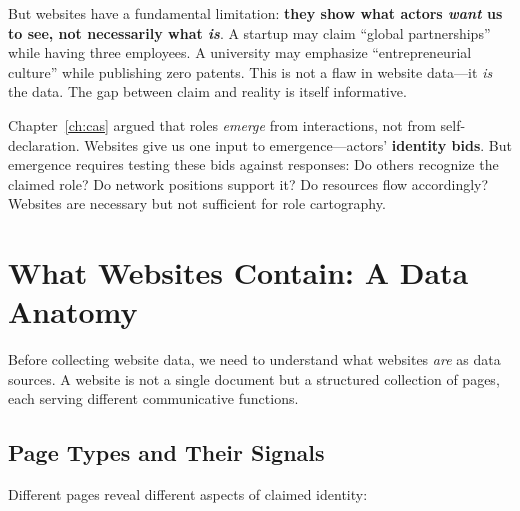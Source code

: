 But websites have a fundamental limitation: \textbf{they show what actors \emph{want} us to see, not necessarily what \emph{is}}. A startup may claim ``global partnerships'' while having three employees. A university may emphasize ``entrepreneurial culture'' while publishing zero patents. This is not a flaw in website data---it \emph{is} the data. The gap between claim and reality is itself informative.

\begin{insightbox}
Chapter~\ref{ch:cas} argued that roles \emph{emerge} from interactions, not from self-declaration. Websites give us one input to emergence---actors' \textbf{identity bids}. But emergence requires testing these bids against responses: Do others recognize the claimed role? Do network positions support it? Do resources flow accordingly? Websites are necessary but not sufficient for role cartography.
\end{insightbox}


\section*{What Websites Contain: A Data Anatomy}

Before collecting website data, we need to understand what websites \emph{are} as data sources. A website is not a single document but a structured collection of pages, each serving different communicative functions.


\subsection*{Page Types and Their Signals}

Different pages reveal different aspects of claimed identity:

